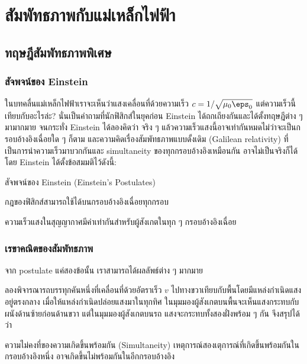 \chapter{สัมพัทธภาพกับแม่เหล็กไฟฟ้า}

\section{ทฤษฎีสัมพัทธภาพพิเศษ}

\subsection{สัจพจน์ของ Einstein}

ในบทคลื่นแม่เหล็กไฟฟ้าเราจะเห็นว่าแสงเคลื่อนที่ด้วยความเร็ว $c = 1/\sqrt{\mu_0\eps_0}$ แต่ความเร็วนี้เทียบกับอะไรล่ะ? นั่นเป็นคำถามที่นักฟิสิกส์ในยุคก่อน Einstein ได้ถกเถียงกันและได้ตั้งทฤษฎีต่าง ๆ มามากมาย จนกระทั่ง Einstein ได้ลองคิดว่า จริง ๆ แล้วความเร็วแสงนี้อาจเท่ากันหมดไม่ว่าจะเป็นกรอบอ้างอิงเฉื่อยใด ๆ ก็ตาม และความคิดเรื่องสัมพัทธภาพแบบดั้งเดิม (Galilean relativity) ที่เป็นการนำความเร็วมาบวกกันและ simultaneity ของทุกกรอบอ้างอิงเหมือนกัน อาจไม่เป็นจริงก็ได้ โดย Einstein ได้ตั้งข้อสมมติไว้ดังนี้:
\begin{lawbox}{สัจพจน์ของ Einstein (Einstein's Postulates)}
    \begin{compactenum}
        \item กฎของฟิสิกส์สามารถใช้ได้บนกรอบอ้างอิงเฉื่อยทุกกรอบ
        \item ความเร็วแสงในสุญญากาศมีค่าเท่ากันสำหรับผู้สังเกตในทุก ๆ กรอบอ้างอิงเฉื่อย
    \end{compactenum}
\end{lawbox}

\subsection{เรขาคณิตของสัมพัทธภาพ}

จาก postulate แค่สองข้อนั้น เราสามารถได้ผลลัพธ์ต่าง ๆ มากมาย

ลองพิจารณารถบรรทุกคันหนึ่งที่เคลื่อนที่ด้วยอัตราเร็ว $v$ ไปทางขวาเทียบกับพื้นโดยมีแหล่งกำเนิดแสงอยู่ตรงกลาง เมื่อให้แหล่งกำเนิดปล่อยแสงมาในทุกทิศ ในมุมมองผู้สังเกตบนพื้นจะเห็นแสงกระทบกับผนังด้านซ้ายก่อนด้านขวา แต่ในมุมมองผู้สังเกตบนรถ แสงจะกระทบทั้งสองฝั่งพร้อม ๆ กัน จึงสรุปได้ว่า
\begin{lawbox}{ความไม่คงที่ของความเกิดขึ้นพร้อมกัน (Simultaneity)}
    เหตุการณ์สองเตุการณ์ที่เกิดขึ้นพร้อมกันในกรอบอ้างอิงหนึ่ง อาจเกิดขึ้นไม่พร้อมกันในอีกกรอบอ้างอิง
\end{lawbox}

